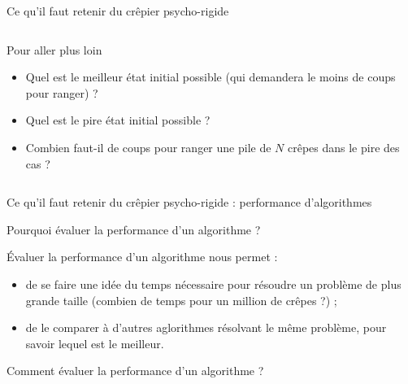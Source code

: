 \begin{frame}{Ce qu'il faut retenir du  crêpier psycho-rigide}
\begin{columns}
\begin{column}{.3\linewidth}
\begin{block}{Pour aller plus loin}
        \begin{itemize}
          \item Quel est le meilleur état initial possible (qui demandera le moins de coups pour ranger) ?
          \item Quel est le pire état initial possible ?
          \item Combien faut-il de coups pour ranger une pile de $N$ crêpes dans le pire des cas ?
        \end{itemize}
      \end{block}
    \end{column}
  \end{columns}
      
\end{frame}

\begin{frame}{Ce qu'il faut retenir du crêpier psycho-rigide : performance d'algorithmes}

  \begin{block}{Pourquoi évaluer la performance d'un algorithme ?}

    Évaluer la performance d'un algorithme nous permet :

    \begin{itemize}
      \item de se faire une idée du temps nécessaire pour résoudre un problème de plus grande taille (combien de temps pour un million de crêpes ?) ;
      \item de le comparer à d'autres aglorithmes résolvant le même problème, pour savoir lequel est le meilleur.
    \end{itemize}

  \end{block}

  \begin{block}{Comment évaluer la performance d'un algorithme ?}


\end{block}
\end{frame}
